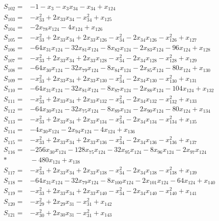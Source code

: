 \begin{align*}
S_{102}={}&-1-x_{3}-x_{3}x_{34}-x_{34}+x_{124}\\[3pt]
S_{103}={}&-x_{33}^{2}+2x_{33}x_{34}-x_{34}^{2}+x_{125}\\[3pt]
S_{104}={}&-2x_{78}x_{124}-4x_{124}+x_{126}\\[3pt]
S_{105}={}&-x_{33}^{2}+2x_{33}x_{34}+2x_{33}x_{126}-x_{34}^{2}-2x_{34}x_{126}-x_{126}^{2}+x_{127}\\[3pt]
S_{106}={}&-64x_{31}x_{124}-32x_{81}x_{124}-8x_{82}x_{124}-2x_{83}x_{124}-96x_{124}+x_{128}\\[3pt]
S_{107}={}&-x_{33}^{2}+2x_{33}x_{34}+2x_{33}x_{128}-x_{34}^{2}-2x_{34}x_{128}-x_{128}^{2}+x_{129}\\[3pt]
S_{108}={}&-64x_{30}x_{124}-32x_{79}x_{124}-8x_{84}x_{124}-2x_{85}x_{124}-80x_{124}+x_{130}\\[3pt]
S_{109}={}&-x_{33}^{2}+2x_{33}x_{34}+2x_{33}x_{130}-x_{34}^{2}-2x_{34}x_{130}-x_{130}^{2}+x_{131}\\[3pt]
S_{110}={}&-64x_{31}x_{124}-32x_{81}x_{124}-8x_{87}x_{124}-2x_{88}x_{124}-104x_{124}+x_{132}\\[3pt]
S_{111}={}&-x_{33}^{2}+2x_{33}x_{34}+2x_{33}x_{132}-x_{34}^{2}-2x_{34}x_{132}-x_{132}^{2}+x_{133}\\[3pt]
S_{112}={}&-64x_{30}x_{124}-32x_{75}x_{124}-8x_{89}x_{124}-2x_{90}x_{124}-80x_{124}+x_{134}\\[3pt]
S_{113}={}&-x_{33}^{2}+2x_{33}x_{34}+2x_{33}x_{134}-x_{34}^{2}-2x_{34}x_{134}-x_{134}^{2}+x_{135}\\[3pt]
S_{114}={}&-4x_{30}x_{124}-2x_{94}x_{124}-4x_{124}+x_{136}\\[3pt]
S_{115}={}&-x_{33}^{2}+2x_{33}x_{34}+2x_{33}x_{136}-x_{34}^{2}-2x_{34}x_{136}-x_{136}^{2}+x_{137}\\[3pt]
S_{116}={}&-256x_{30}x_{124}-128x_{75}x_{124}-32x_{95}x_{124}-8x_{96}x_{124}-2x_{97}x_{124}\\*
&{}-480x_{124}+x_{138}\\[3pt]
S_{117}={}&-x_{33}^{2}+2x_{33}x_{34}+2x_{33}x_{138}-x_{34}^{2}-2x_{34}x_{138}-x_{138}^{2}+x_{139}\\[3pt]
S_{118}={}&-64x_{31}x_{124}-32x_{79}x_{124}-8x_{100}x_{124}-2x_{101}x_{124}-64x_{124}+x_{140}\\[3pt]
S_{119}={}&-x_{33}^{2}+2x_{33}x_{34}+2x_{33}x_{140}-x_{34}^{2}-2x_{34}x_{140}-x_{140}^{2}+x_{141}\\[3pt]
S_{120}={}&-x_{29}^{2}+2x_{29}x_{31}-x_{31}^{2}+x_{142}\\[3pt]
S_{121}={}&-x_{30}^{2}+2x_{30}x_{31}-x_{31}^{2}+x_{143}\\[3pt]

\end{align*}
